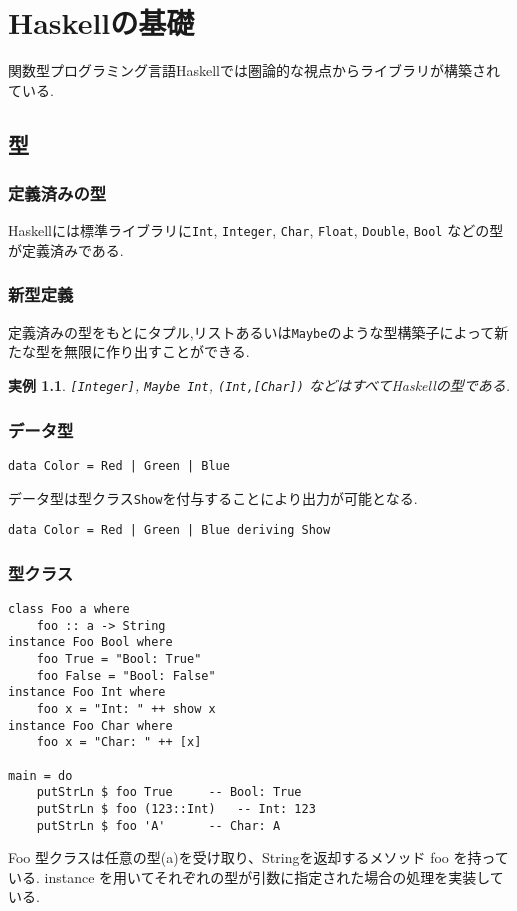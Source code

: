 \documentclass[dvipdfmx]{jsbook}
\theoremstyle{plain}
\newtheorem{example}[thm]{実例}
\begin{document}
\chapter{Haskellの基礎}
関数型プログラミング言語Haskellでは圏論的な視点からライブラリが構築されている.
\section{型}
\subsection{定義済みの型}
Haskellには標準ライブラリに\verb|Int|, \verb|Integer|, 
\verb|Char|,
\verb|Float|,
\verb|Double|,
\verb|Bool|
などの型が定義済みである.
\subsection{新型定義}
定義済みの型をもとにタプル,リストあるいは\verb|Maybe|のような型構築子によって新たな型を無限に作り出すことができる.
\begin{example}
\verb|[Integer]|, \verb|Maybe Int|,
\verb|(Int,[Char])| などはすべてHaskellの型である.
\end{example}
\subsection{データ型}
\begin{lstlisting}
data Color = Red | Green | Blue 
\end{lstlisting}
データ型は型クラス\verb|Show|を付与することにより出力が可能となる.
\begin{lstlisting}
data Color = Red | Green | Blue deriving Show
\end{lstlisting}
\subsection{型クラス}
\begin{lstlisting}
class Foo a where
    foo :: a -> String
instance Foo Bool where
    foo True = "Bool: True"
    foo False = "Bool: False"
instance Foo Int where
    foo x = "Int: " ++ show x
instance Foo Char where
    foo x = "Char: " ++ [x]

main = do
    putStrLn $ foo True		-- Bool: True
    putStrLn $ foo (123::Int)	-- Int: 123
    putStrLn $ foo 'A'		-- Char: A
\end{lstlisting}
Foo 型クラスは任意の型(a)を受け取り、Stringを返却するメソッド foo を持っている. instance を用いてそれぞれの型が引数に指定された場合の処理を実装している.
\end{document}
